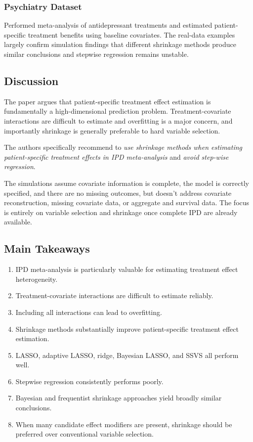 \documentclass[11pt]{article}
\begin{document}
\subsubsection*{Psychiatry Dataset}

Performed meta-analysis of antidepressant treatments and estimated patient-specific treatment benefits using baseline covariates. The real-data examples largely confirm simulation findings that different shrinkage methods produce similar conclusions and stepwise regression remains unstable.

\subsection*{Discussion}

The paper argues that patient-specific treatment effect estimation is fundamentally a high-dimensional prediction problem. Treatment-covariate interactions are difficult to estimate and overfitting is a major concern, and importantly shrinkage is generally preferable to hard variable selection.

The authors specifically recommend to \emph{use shrinkage methods when estimating patient-specific treatment effects in IPD meta-analysis} and \emph{avoid step-wise regression}.

The simulations assume covariate information is complete, the model is correctly specified, and there are no missing outcomes, but doesn't address covariate reconstruction, missing covariate data, or aggregate and survival data. The focus is entirely on variable selection and shrinkage once complete IPD are already available.

\subsection*{Main Takeaways}

\begin{enumerate}
    \item IPD meta-analysis is particularly valuable for estimating treatment effect heterogeneity.
    \item Treatment-covariate interactions are difficult to estimate reliably.
    \item Including all interactions can lead to overfitting.
    \item Shrinkage methods substantially improve patient-specific treatment effect estimation.
    \item LASSO, adaptive LASSO, ridge, Bayesian LASSO, and SSVS all perform well.
    \item Stepwise regression consistently performs poorly.
    \item Bayesian and frequentist shrinkage approaches yield broadly similar conclusions.
    \item When many candidate effect modifiers are present, shrinkage should be preferred over conventional variable selection.
\end{enumerate}
\end{document}
